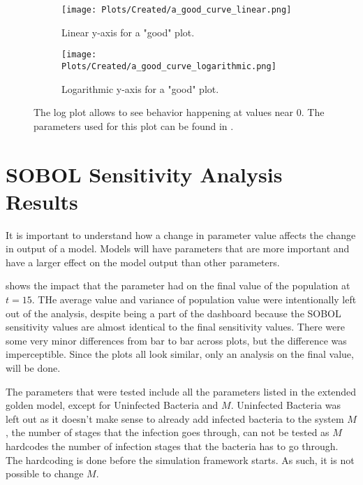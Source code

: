 \begin{figure}[h!]
    \centering
    \begin{subfigure}{1\linewidth}
        \centering
        \captionsetup{width=1\linewidth}
        \texttt{[image: Plots/Created/a\_good\_curve\_linear.png]}
        \caption{
            Linear y-axis for a "good" plot. 
        }
        \label{fig:created:a_good_curve_linear}
    \end{subfigure}
    \hfill
    \begin{subfigure}{1\linewidth}
        \centering
        \captionsetup{width=1\linewidth}
        \texttt{[image: Plots/Created/a\_good\_curve\_logarithmic.png]}
        \caption{
            Logarithmic y-axis for a "good" plot. 
        }
        \label{fig:created:a_good_curve_logarithmic}
    \end{subfigure}
    \caption{
        The log plot allows to see behavior happening at values near 0. 
        The parameters used for this plot can be found in . 
    }
    \label{fig:created:a_good_curve}
\end{figure}

\section{SOBOL Sensitivity Analysis Results}
\label{sec:SOBOL_sensitivity_analysis_results}
It is important to understand how a change in parameter value affects the change in output of a model. 
Models will have parameters that are more important and have a larger effect on the model output than other parameters. 

 shows the impact that the parameter had on the final value of the population at $t=15$. 
THe average value and variance of population value were intentionally left out of the analysis, despite being a part of the dashboard because the SOBOL sensitivity values are almost identical to the final sensitivity values. 
There were some very minor differences from bar to bar across plots, but the difference was imperceptible. 
Since the plots all look similar, only an analysis on the final value,  will be done. 

The parameters that were tested include all the parameters listed in the extended golden model, except for Uninfected Bacteria and $M$. 
Uninfected Bacteria was left out as it doesn't make sense to already add infected bacteria to the system
$M$, the number of stages that the infection goes through, can not be tested as $M$ hardcodes the number of infection stages that the bacteria has to go through. 
The hardcoding is done before the simulation framework starts. 
As such, it is not possible to change $M$. 

